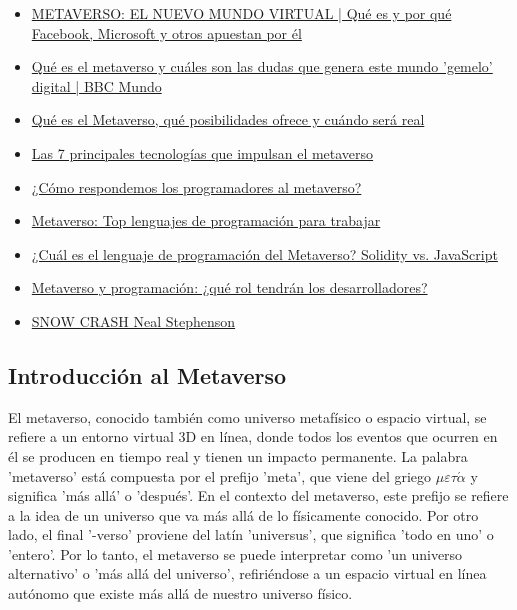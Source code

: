 \documentclass[a4paper,10pt]{article}
\begin{document}
	\begin{itemize}
		\item \href{https://www.youtube.com/watch?v=x000E3ziMhs}{METAVERSO: EL NUEVO MUNDO VIRTUAL | Qué es y por qué Facebook, Microsoft y otros apuestan por él}
		\item \href{https://www.youtube.com/watch?v=XIJwITC2DeU}{Qué es el metaverso y cuáles son las dudas que genera este mundo 'gemelo' digital | BBC Mundo}
		\item \href{https://www.xataka.com/basics/que-metaverso-que-posibilidades-ofrece-cuando-sera-real}{Qué es el Metaverso, qué posibilidades ofrece y cuándo será real}
		\item \href{https://academy.binance.com/es/articles/top-7-technologies-that-power-the-metaverse}{Las 7 principales tecnologías que impulsan el metaverso}
		\item \href{https://www.zoomtecnologico.com/2021/12/07/metaverso-zuckerberg/}{¿Cómo respondemos los programadores al metaverso?}
		\item \href{https://tecnovr.net/metaverso-top-lenguajes-de-programacion-para-trabajar/}{Metaverso: Top lenguajes de programación para trabajar}
		\item \href{https://metaverso247.com/metaverso/2022/12/14/cual-es-el-lenguaje-de-programacion-del-metaverso-solidity-vs-javascript/}{¿Cuál es el lenguaje de programación del Metaverso? Solidity vs. JavaScript}
		\item \href{https://blog.soyhenry.com/metaverso-y-programacion-que-rol-tendran-los-desarrolladores/}{Metaverso y programación: ¿qué rol tendrán los desarrolladores?}
		\item \href{https://www.icesi.edu.co/blogs/identidadesavatar/files/2009/01/neal_20stephenson_20-_20snow_20crash.pdf}{SNOW CRASH Neal Stephenson}
	\end{itemize}
	\subsection{Introducción al Metaverso}
	El metaverso, conocido también como universo metafísico o espacio virtual, se refiere a un entorno virtual 3D en línea, donde todos los eventos que ocurren en él se producen en tiempo real y tienen un impacto permanente. La palabra 'metaverso' está compuesta por el prefijo 'meta', que viene del griego \( \mu\varepsilon\tau\acute{\alpha} \) y significa 'más allá' o 'después'. En el contexto del metaverso, este prefijo se refiere a la idea de un universo que va más allá de lo físicamente conocido. Por otro lado, el final '-verso' proviene del latín 'universus', que significa 'todo en uno' o 'entero'. Por lo tanto, el metaverso se puede interpretar como 'un universo alternativo' o 'más allá del universo', refiriéndose a un espacio virtual en línea autónomo que existe más allá de nuestro universo físico.
	
\end{document}
